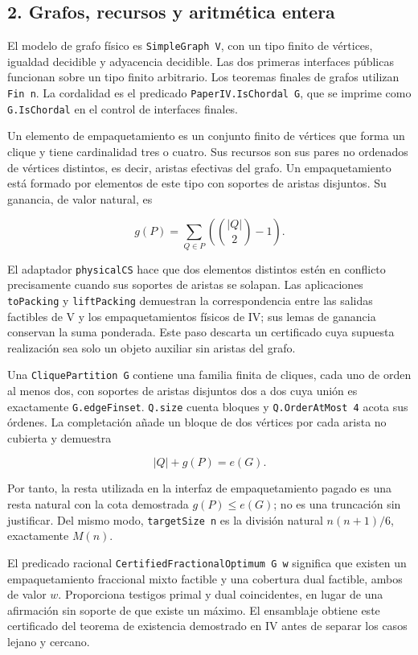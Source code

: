 \documentclass[spanish,11pt,a4paper]{article}
\begin{document}
\subsection{2. Grafos, recursos y aritmética
entera}\label{grafos-recursos-y-aritmuxe9tica-entera}

El modelo de grafo físico es \texttt{SimpleGraph\ V}, con un tipo finito
de vértices, igualdad decidible y adyacencia decidible. Las dos primeras
interfaces públicas funcionan sobre un tipo finito arbitrario. Los
teoremas finales de grafos utilizan \texttt{Fin\ n}. La cordalidad es el
predicado \texttt{PaperIV.IsChordal\ G}, que se imprime como
\nolinkurl{G.IsChordal} en el control de interfaces finales.

Un elemento de empaquetamiento es un conjunto finito de vértices que
forma un clique y tiene cardinalidad tres o cuatro. Sus recursos son sus
pares no ordenados de vértices distintos, es decir, aristas efectivas
del grafo. Un empaquetamiento está formado por elementos de este tipo
con soportes de aristas disjuntos. Su ganancia, de valor natural, es

\[
g(P)=\sum_{Q\in P}\left(\binom{|Q|}{2}-1\right).
\]

El adaptador \nolinkurl{physicalCS} hace que dos elementos distintos estén
en conflicto precisamente cuando sus soportes de aristas se solapan. Las
aplicaciones \nolinkurl{toPacking} y \nolinkurl{liftPacking} demuestran la
correspondencia entre las salidas factibles de V y los empaquetamientos
físicos de IV; sus lemas de ganancia conservan la suma ponderada. Este
paso descarta un certificado cuya supuesta realización sea solo un
objeto auxiliar sin aristas del grafo.

Una \texttt{CliquePartition\ G} contiene una familia finita de cliques,
cada uno de orden al menos dos, con soportes de aristas disjuntos dos a
dos cuya unión es exactamente \nolinkurl{G.edgeFinset}. \nolinkurl{Q.size}
cuenta bloques y \texttt{Q.OrderAtMost\ 4} acota sus órdenes. La
completación añade un bloque de dos vértices por cada arista no cubierta
y demuestra

\[
|Q|+g(P)=e(G).
\]

Por tanto, la resta utilizada en la interfaz de empaquetamiento pagado
es una resta natural con la cota demostrada \(g(P)\le e(G)\); no es una
truncación sin justificar. Del mismo modo, \texttt{targetSize\ n} es la
división natural \(n(n+1)/6\), exactamente \(M(n)\).

El predicado racional \texttt{CertifiedFractionalOptimum\ G\ w}
significa que existen un empaquetamiento fraccional mixto factible y una
cobertura dual factible, ambos de valor \(w\). Proporciona testigos
primal y dual coincidentes, en lugar de una afirmación sin soporte de
que existe un máximo. El ensamblaje obtiene este certificado del teorema
de existencia demostrado en IV antes de separar los casos lejano y
cercano.
\end{document}
